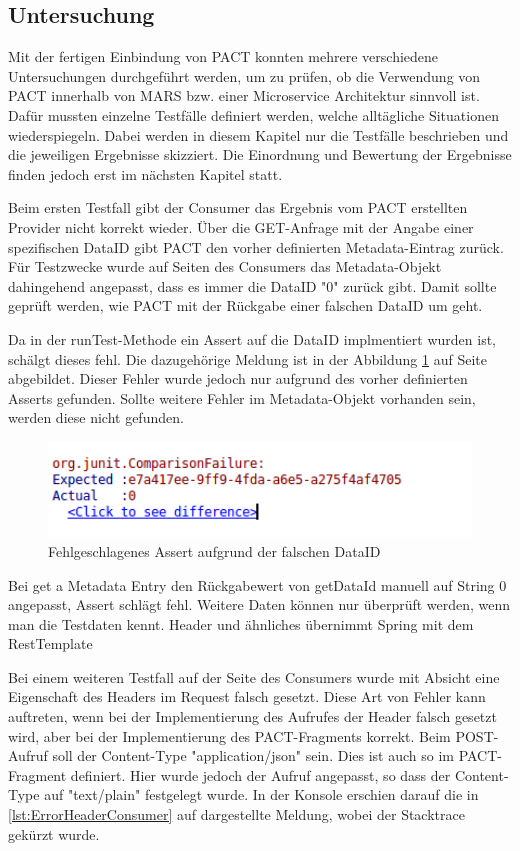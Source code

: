 \documentclass{llncs}
\begin{document}
\subsection{Untersuchung}
Mit der fertigen Einbindung von PACT konnten mehrere verschiedene Untersuchungen durchgeführt werden, um zu prüfen, ob die Verwendung von PACT innerhalb von MARS bzw. einer Microservice Architektur sinnvoll ist. Dafür mussten einzelne Testfälle definiert werden, welche alltägliche Situationen wiederspiegeln. Dabei werden in diesem Kapitel nur die Testfälle beschrieben und die jeweiligen Ergebnisse skizziert. Die Einordnung und Bewertung der Ergebnisse finden jedoch erst im nächsten Kapitel statt.

Beim ersten Testfall gibt der Consumer das Ergebnis vom PACT erstellten Provider nicht korrekt wieder. Über die GET-Anfrage mit der Angabe einer spezifischen DataID gibt PACT den vorher definierten Metadata-Eintrag zurück. Für Testzwecke wurde auf Seiten des Consumers das Metadata-Objekt dahingehend angepasst, dass es immer die DataID "0" zurück gibt. Damit sollte geprüft werden, wie PACT mit der Rückgabe einer falschen DataID um geht.

Da in der runTest-Methode ein Assert auf die DataID implmentiert wurden ist, schälgt dieses fehl. Die dazugehörige Meldung ist in der Abbildung \ref{fig:ErrorConsumerGet} auf Seite \pageref{fig:ErrorConsumerGet} abgebildet. Dieser Fehler wurde jedoch nur aufgrund des vorher definierten Asserts gefunden. Sollte weitere Fehler im Metadata-Objekt vorhanden sein, werden diese nicht gefunden.

\begin{figure}[htbp]
  \centering
      \includegraphics[width=1\textwidth]{./Images/Error_Consumer-GET}
    \caption{Fehlgeschlagenes Assert aufgrund der falschen DataID}
    \label{fig:ErrorConsumerGet}
\end{figure}

Bei get a Metadata Entry den Rückgabewert von getDataId manuell auf String 0 angepasst, Assert schlägt fehl. Weitere Daten können nur überprüft werden, wenn man die Testdaten kennt. Header und ähnliches übernimmt Spring mit dem RestTemplate

Bei einem weiteren Testfall auf der Seite des Consumers wurde mit Absicht eine Eigenschaft des Headers im Request falsch gesetzt. Diese Art von Fehler kann auftreten, wenn bei der Implementierung des Aufrufes der Header falsch gesetzt wird, aber bei der Implementierung des PACT-Fragments korrekt. Beim POST-Aufruf soll der Content-Type "application/json" sein. Dies ist auch so im PACT-Fragment definiert. Hier wurde jedoch der Aufruf angepasst, so dass der Content-Type auf "text/plain" festgelegt wurde. In der Konsole erschien darauf die in \ref{lst:ErrorHeaderConsumer} auf \pageref{lst:ErrorHeaderConsumer} dargestellte Meldung, wobei der Stacktrace gekürzt wurde.
\end{document}
